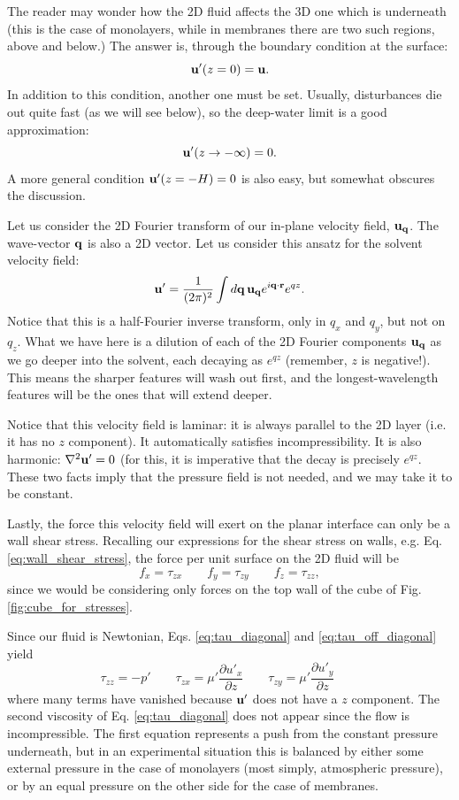 The reader may wonder how the 2D fluid affects the 3D one which is
underneath (this is the case of monolayers, while in membranes there
are two such regions, above and below.) The answer is, through the
boundary condition at the surface:
\[
  \mathbf{u}'(z=0) = \mathbf{u} .
\]
In addition to this condition, another one must be set. Usually,
disturbances die out quite fast (as we will see below), so the
deep-water limit is a good approximation:
\[
  \mathbf{u}'(z \to -\infty ) = 0 .
\]
A more general condition $\mathbf{u}'(z = -H ) = 0$ is also easy, but
somewhat obscures the discussion.

Let us consider the 2D Fourier transform of our in-plane velocity
field, $\mathbf{u}_{\mathbf{q}}$. The wave-vector $\mathbf{q}$ is also a 2D vector. Let us
consider this ansatz for the solvent velocity field:
\[
  \mathbf{u}' =  \frac 1{(2\pi)^2}  \int d\mathbf{q} \, \mathbf{u}_{\mathbf{q}} e^{ i\mathbf{q}\cdot\mathbf{r}} e^{q z} .
\]
Notice that this is a half-Fourier inverse transform, only in $q_x$
and $q_y$, but not on $q_z$. What we have here is a dilution of each
of the 2D Fourier components $\mathbf{u}_{\mathbf{q}}$ as we go deeper into the
solvent, each decaying as $e^{q z} $ (remember, $z$ is
negative!). This means the sharper features will wash out first, and
the longest-wavelength features will be the ones that will extend
deeper.

Notice that this velocity field is laminar: it is always parallel to
the 2D layer (i.e. it has no $z$ component). It automatically
satisfies incompressibility. It is also harmonic: $\nabla^2 \mathbf{u}' = 0$
(for this, it is imperative that the decay is precisely
$e^{qz}$. These two facts imply that the pressure field is not needed,
and we may take it to be constant.

Lastly, the force this velocity field will exert on the planar
interface can only be a wall shear stress. Recalling our expressions
for the shear stress on walls, e.g. Eq.  \ref{eq:wall_shear_stress},
the force per unit surface on the 2D fluid will be
\begin{equation*}
  f_x =  \tau_{zx} \qquad
  f_y =  \tau_{zy} \qquad
  f_z =  \tau_{zz} ,
\end{equation*}
since we would be considering only forces on the top wall of the cube
of Fig. \ref{fig:cube_for_stresses}.

Since our fluid is Newtonian, Eqs. \ref{eq:tau_diagonal} and
\ref{eq:tau_off_diagonal} yield
\begin{equation*}
  \tau_{zz} = -p'  \qquad
  \tau_{zx} = \mu' \frac{\partial u'_x}{\partial z}  \qquad
  \tau_{zy} = \mu' \frac{\partial u'_y}{\partial z}  \qquad
\end{equation*}
where many terms have vanished because $\mathbf{u}'$ does not have a $z$
component. The second viscosity of Eq. \ref{eq:tau_diagonal} does not
appear since the flow is incompressible. The first equation represents
a push from the constant pressure underneath, but in an experimental
situation this is balanced by either some external pressure in
the case of monolayers (most simply, atmospheric pressure), or
by an equal pressure on the other side for the case of membranes.

